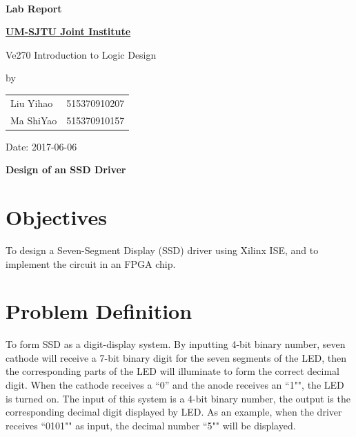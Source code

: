 \documentclass{article}
\date{}
\begin{document}
\vspace*{3mm}

\begin{minipage}{0.6\linewidth}
\ 
\end{minipage}
\hfill
\begin{minipage}{0.38\linewidth}
\begin{center}
\huge\bfseries
Lab Report \\[8mm]
\fontsize{100pt}{\baselineskip}
\end{center}
\end{minipage}

\vspace*{1cm}

{\huge\bfseries
\uline{UM-SJTU Joint Institute \phantom{xxxxxxxxxxxx}}
\vspace*{2mm}

Ve270 Introduction to Logic Design
}	

\vspace*{2cm}
\begin{center}
\LARGE
by \\[2mm]
\begin{tabular}{ll}
Liu Yihao & 515370910207 \\
Ma ShiYao & 515370910157
\end{tabular}

\vspace*{2cm}
Date: 2017-06-06
\end{center}

\vspace*{2cm}
\begin{center}
\Huge\bfseries
Design of an SSD Driver
\end{center}

\newpage

\section{Objectives}
To design a Seven-Segment Display (SSD) driver using Xilinx ISE, and to implement the circuit in an FPGA chip.

\section{Problem Definition}
To form SSD as a digit-display system. By inputting 4-bit binary number, seven cathode will receive a 7-bit binary digit for the seven segments of the LED, then the corresponding parts of the LED will illuminate to form the correct decimal digit. When the cathode receives a ``0'' and the anode receives an ``1"", the LED is turned on. The input of this system is a 4-bit binary number, the output is the corresponding decimal digit displayed by LED. As an example, when the driver receives ``0101"" as input, the decimal number ``5"" will be displayed.
\end{document}
